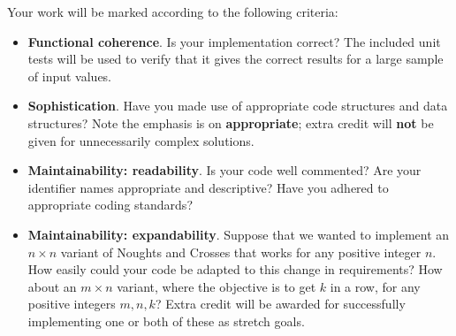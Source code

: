\documentclass{../../../fal_assignment}
\begin{document}
Your work will be marked according to the following criteria:
\begin{itemize}
	\item \textbf{Functional coherence}. Is your implementation correct?
		The included unit tests will be used to verify that it gives the correct results for a large sample of input values.
	\item \textbf{Sophistication}. Have you made use of appropriate code structures and data structures?
		Note the emphasis is on \textbf{appropriate}; extra credit will \textbf{not} be given for unnecessarily complex solutions.
	\item \textbf{Maintainability: readability}. Is your code well commented? Are your identifier names appropriate and descriptive?
		Have you adhered to appropriate coding standards?
	\item \textbf{Maintainability: expandability}. Suppose that we wanted to implement an $n \times n$ variant of Noughts and Crosses
		that works for any positive integer $n$.
		How easily could your code be adapted to this change in requirements?
		How about an $m \times n$ variant, where the objective is to get $k$ in a row,
		for any positive integers $m,n,k$?
		Extra credit will be awarded for successfully implementing one or both of these as stretch goals.
\end{itemize}
\end{document}
